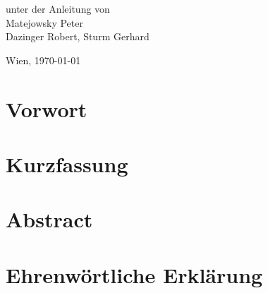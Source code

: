 \documentclass[
    headings=optiontotocandhead,%
    twoside,
    numbers=noenddot,%
    toc=flat, %
    12pt, %
    titlepage, %
    parskip=full, %
    listof=totoc, %
    listof=flat, %
    numbers=noenddot, %
    bibliography=totoc, %
    a4paper,DIV=14,
    BCOR=15mm,
]{scrbook}
\begin{document}
\begin{titlepage}
\begin{center}
\par\end{center}{\large \par}

\begin{center}
\vspace{20mm}
 \normalsize unter der Anleitung von\\
 \vspace{0.5cm}
Matejowsky Peter\\
Dazinger Robert,
Sturm Gerhard
\par\end{center}

\begin{center}
\vspace{5mm}
Wien, \today
\par\end{center}

\end{titlepage}%
\chapter*{Vorwort}


\chapter*{Kurzfassung}


\chapter*{Abstract}


\chapter*{Ehrenwörtliche Erklärung}


\cleardoublepage{}
\tableofcontents{}
\cleardoublepage{}
\listoftables
\cleardoublepage{}
\listoffigures


\cleardoublepage{}
\mainmatter
\end{document}
